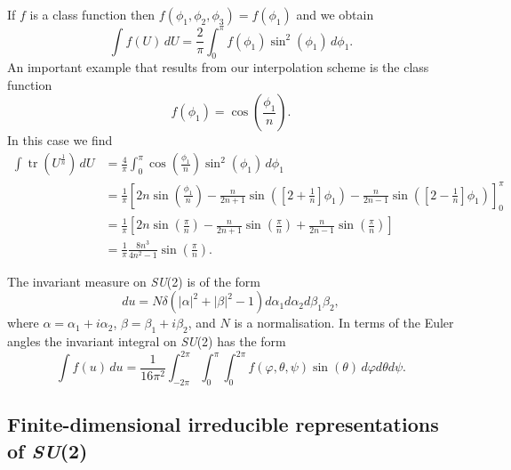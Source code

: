\documentclass[12pt]{amsart}
\newcommand{\tr}{\operatorname{tr}}
\def\su2{\textsl{SU}(2)}
\theoremstyle{definition}
\theoremstyle{remark}
\numberwithin{equation}{section}
\begin{document}
If $f$ is a class function then $f(\phi_1,\phi_2,\phi_3) = f(\phi_1)$ and we obtain
\begin{equation}
	\int f(U)\, dU = \frac{2}{\pi}\int_0^\pi f(\phi_1)\sin^2(\phi_1)\,d\phi_1.
\end{equation}
An important example that results from our interpolation scheme is the class function
\begin{equation}
	f(\phi_1) = \cos\left(\frac{\phi_1}{n}\right).
\end{equation}
In this case we find
\begin{equation}
	\begin{split}
		\int \tr(U^{\frac1n})\, dU &= \frac{4}{\pi}\int_0^\pi \cos\left(\frac{\phi_1}{n}\right)\sin^2(\phi_1)\,d\phi_1 \\ 
		&= \frac{1}{\pi}\left[2n\sin\left(\frac{\phi_1}{n}\right) - \frac{n}{2n+1}\sin\left(\left[2+\frac{1}{n}\right]\phi_1\right)- \frac{n}{2n-1}\sin\left(\left[2-\frac{1}{n}\right]\phi_1\right)\right]_0^\pi \\
		&= \frac{1}{\pi}\left[2n\sin\left(\frac{\pi}{n}\right) - \frac{n}{2n+1}\sin\left(\frac{\pi}{n}\right) + \frac{n}{2n-1}\sin\left(\frac{\pi}{n}\right)\right] \\
		&= \frac{1}{\pi} \frac{8n^3}{4n^2 -1} \sin\left(\frac{\pi}{n}\right).
		\end{split}
\end{equation}

The invariant measure on \su2 is of the form
\begin{equation}
	du = N \delta(|\alpha|^2 + |\beta|^2 - 1)d\alpha_1d\alpha_2d\beta_1\beta_2,
\end{equation}
where $\alpha = \alpha_1 + i\alpha_2$, $\beta = \beta_1 + i\beta_2$, and $N$ is a normalisation. In terms of the Euler angles the invariant integral on \su2
has the form
\begin{equation}
	\int f(u) \, du = \frac{1}{16\pi^2} \int_{-2\pi}^{2\pi} \int_0^\pi \int_0^{2\pi} f(\varphi, \theta, \psi) \sin(\theta)\, d\varphi d\theta d\psi.
\end{equation}

\subsection{Finite-dimensional irreducible representations of \su2}
\end{document}
